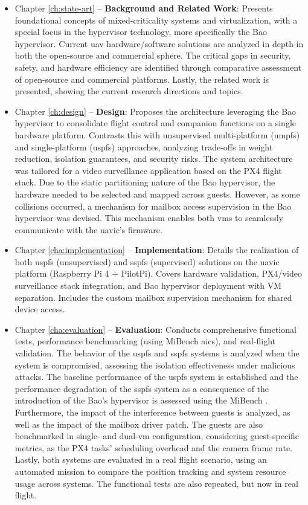\begin{itemize}
\item
  Chapter \ref{ch:state-art} -- \textbf{Background and Related Work}:
Presents foundational concepts of mixed-criticality systems and virtualization,
with a special focus in the hypervisor technology, more specifically the Bao
hypervisor. Current
\gls{uav} hardware/software solutions are analyzed in depth in both the
open-source and commercial sphere. The critical gaps in security,
safety, and hardware efficiency are identified through comparative assessment of
open-source and commercial platforms. Lastly, the related work is presented, showing the current research directions and topics.

\item 
Chapter \ref{ch:design} -- \textbf{Design}:
Proposes the  architecture leveraging the Bao hypervisor to
consolidate flight control and companion functions on a single hardware
platform. Contrasts this with unsupervised multi-platform (\gls{umpfs}) and
single-platform (\gls{uspfs}) approaches, analyzing trade-offs in weight
reduction, isolation guarantees, and security risks. The system architecture was
tailored for a video surveillance application based on the PX4 flight stack. Due
to the static partitioning nature of the Bao hypervisor, the hardware needed to
be selected and mapped across guests. However, as some collisions occurred, a
mechanism for mailbox access supervision in the Bao hypervisor was devised. This
mechanism enables both \glspl{vm} to seamlessly communicate with the
\gls{uavic}'s firmware.

\item 
Chapter \ref{cha:implementation} -- \textbf{Implementation}:
Details the realization of both \gls{uspfs} (unsupervised) and \gls{sspfs}
(supervised) solutions on the \gls{uavic} platform (Raspberry Pi 4 +
PilotPi). Covers hardware validation, PX4/video surveillance stack integration,
and Bao hypervisor deployment with VM separation. Includes the custom mailbox
supervision mechanism for shared device access.

\item 
Chapter \ref{cha:evaluation} --  \textbf{Evaluation}:
Conducts comprehensive functional tests, performance benchmarking (using MiBench
\gls{aics}), and real-flight validation. The behavior of the \gls{uspfs} and
\gls{sspfs} systems is analyzed when the system is compromised, assessing the
isolation effectiveness under malicious attacks.
The baseline performance of the \gls{uspfs} system is
established and the performance degradation of the \gls{sspfs} system as a
consequence of the introduction of the Bao's hypervisor is assessed using the
MiBench .
Furthermore, the impact of the interference between guests is analyzed, as well
as the impact of the mailbox driver patch. The guests are also benchmarked in
single- and dual-\gls{vm} configuration, considering guest-specific metrics, as
the PX4 tasks' scheduling overhead and the camera frame rate.
Lastly, both systems are evaluated in a real flight scenario, using an automated
mission to compare the position tracking and system resource usage across
systems. The functional tests are also repeated, but now in real flight.
    

\end{itemize}
